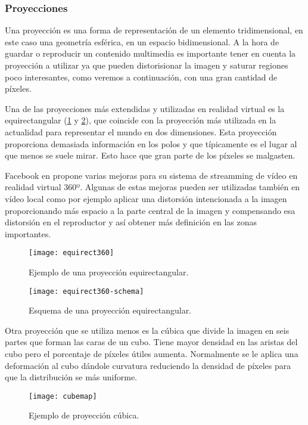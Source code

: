 \subsubsection{Proyecciones}
Una proyección es una forma de representación de un elemento tridimensional, en este caso una geometría esférica, en un espacio bidimensional. A la hora de guardar o reproducir un contenido multimedia es importante tener en cuenta la proyección a utilizar ya que pueden distorisionar la imagen y saturar regiones poco interesantes, como veremos a continuación, con una gran cantidad de píxeles. 

Una de las proyecciones más extendidas y utilizadas en realidad virtual es la equirectangular (\ref{fig:equirect360-example} y \ref{fig:equirect360-schema}), que coincide con la proyección más utilizada en la actualidad para representar el mundo en dos dimensiones. Esta proyección proporciona demasiada información en los polos y que típicamente es el lugar al que menos se suele mirar. Esto hace que gran parte de los píxeles se malgasten. 

Facebook en \cite{FBDynamicStreamming}  propone varias mejoras para su sistema de streamming de vídeo en realidad virtual 360º. Algunas de estas mejoras pueden ser utilizadas también en vídeo local como por ejemplo aplicar una distorsión intencionada a la imagen proporcionando más espacio a la parte central de la imagen y compensando esa distorsión en el reproductor y así obtener más definición en las zonas importantes.

\begin{figure}[H]
  \centering
  \texttt{[image: equirect360]}
  \caption{Ejemplo de una proyección equirectangular.}
  \label{fig:equirect360-example}
\end{figure}

\begin{figure}[H]
  \centering
  \texttt{[image: equirect360-schema]}
  \caption{Esquema de una proyección equirectangular.}
  \label{fig:equirect360-schema}
\end{figure}
\FloatBarrier

Otra proyección que se utiliza menos es la cúbica que divide la imagen en seis partes que forman las caras de un cubo. Tiene mayor densidad en las aristas del cubo pero el porcentaje de píxeles útiles aumenta. Normalmente se le aplica una deformación al cubo dándole curvatura reduciendo la densidad de píxeles para que la distribución se más uniforme.

\begin{figure}[H]
  \centering
  \texttt{[image: cubemap]}
  \caption{Ejemplo de proyección cúbica.}
  \label{fig:cubemap-example}
\end{figure}
\FloatBarrier

